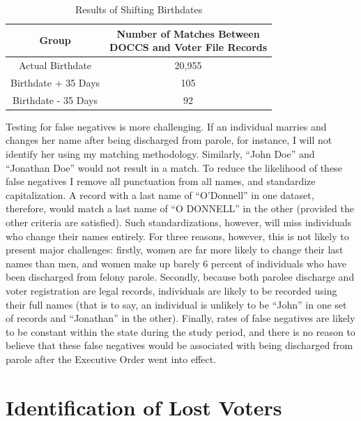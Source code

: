 \documentclass[12pt,]{article}
\begin{document}
\begin{table}[H]

\caption{\label{tab:shift-dobs-chunk}\label{tab:change-dobs} Results of Shifting Birthdates}
\centering
\begin{tabular}[t]{cc}
\toprule
Group & \makecell[l]{Number of Matches Between\\DOCCS and Voter File Records}\\
\midrule
Actual Birthdate & 20,955\\
Birthdate + 35 Days & 105\\
Birthdate - 35 Days & 92\\
\bottomrule
\end{tabular}
\end{table}

Testing for false negatives is more challenging. If an individual marries and changes her name after being discharged from parole, for instance, I will not identify her using my matching methodology. Similarly, ``John Doe'' and ``Jonathan Doe'' would not result in a match. To reduce the likelihood of these false negatives I remove all punctuation from all names, and standardize capitalization. A record with a last name of ``O'Donnell'' in one dataset, therefore, would match a last name of ``O DONNELL'' in the other (provided the other criteria are satisfied). Such standardizations, however, will miss individuals who change their names entirely. For three reasons, however, this is not likely to present major challenges: firstly, women are far more likely to change their last names than men, and women make up barely 6 percent of individuals who have been discharged from felony parole. Secondly, because both parolee discharge and voter registration are legal records, individuals are likely to be recorded using their full names (that is to say, an individual is unlikely to be ``John'' in one set of records and ``Jonathan'' in the other). Finally, rates of false negatives are likely to be constant within the state during the study period, and there is no reason to believe that these false negatives would be associated with being discharged from parole after the Executive Order went into effect.

\hypertarget{identification-of-lost-voters}{%
\section*{Identification of Lost Voters}\label{identification-of-lost-voters}}
\end{document}
